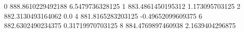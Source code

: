 0 888.8610229492188 6.5479736328125
1 883.4861450195312 1.173095703125
2 882.3130493164062 0.0
4 881.8165283203125 -0.49652099609375
6 882.6302490234375 0.31719970703125
8 884.4769897460938 2.1639404296875

